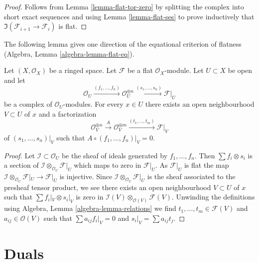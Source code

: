 \begin{proof}
Follows from Lemma \ref{lemma-flat-tor-zero} by splitting the complex
into short exact sequences and using Lemma \ref{lemma-flat-ses} to
prove inductively that $\Im(\mathcal{F}_{i + 1} \to \mathcal{F}_i)$
is flat.
\end{proof}

\noindent
The following lemma gives one direction of the equational criterion of
flatness (Algebra, Lemma \ref{algebra-lemma-flat-eq}).

\begin{lemma}
\label{lemma-flat-eq}
Let $(X, \mathcal{O}_X)$ be a ringed space. Let $\mathcal{F}$ be a flat
$\mathcal{O}_X$-module. Let $U \subset X$ be open and let
$$
\mathcal{O}_U \xrightarrow{(f_1, \ldots, f_n)}
\mathcal{O}_U^{\oplus n} \xrightarrow{(s_1, \ldots, s_n)}
\mathcal{F}|_U
$$
be a complex of $\mathcal{O}_U$-modules. For every $x \in U$ there
exists an open neighbourhood $V \subset U$ of $x$ and a factorization
$$
\mathcal{O}_V^{\oplus n}
\xrightarrow{A}
\mathcal{O}_V^{\oplus m} \xrightarrow{(t_1, \ldots, t_m)}
\mathcal{F}|_V
$$
of $(s_1, \ldots, s_n)|_V$ such that $A \circ (f_1, \ldots, f_n)|_V = 0$.
\end{lemma}

\begin{proof}
Let $\mathcal{I} \subset \mathcal{O}_U$ be the sheaf of ideals
generated by $f_1, \ldots, f_n$. Then $\sum f_i \otimes s_i$ is
a section of $\mathcal{I} \otimes_{\mathcal{O}_U} \mathcal{F}|_U$
which maps to zero in $\mathcal{F}|_U$. As $\mathcal{F}|_U$ is flat
the map
$\mathcal{I} \otimes_{\mathcal{O}_U} \mathcal{F}|_U \to \mathcal{F}|_U$
is injective. Since $\mathcal{I} \otimes_{\mathcal{O}_U} \mathcal{F}|_U$
is the sheaf associated to the presheaf tensor product, we see
there exists an open neighbourhood $V \subset U$ of $x$ such
that $\sum f_i|_V \otimes s_i|_V$ is zero in
$\mathcal{I}(V) \otimes_{\mathcal{O}(V)} \mathcal{F}(V)$.
Unwinding the definitions using Algebra, Lemma \ref{algebra-lemma-relations}
we find $t_1, \ldots, t_m \in \mathcal{F}(V)$ and $a_{ij} \in \mathcal{O}(V)$
such that $\sum a_{ij}f_i|_V = 0$ and $s_i|_V = \sum a_{ij}t_j$.
\end{proof}














\section{Duals}
\label{section-duals}

